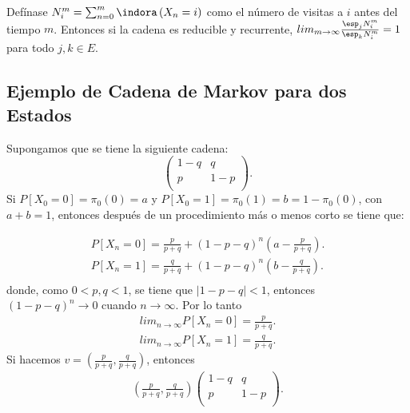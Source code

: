 \begin{Lema}
Def\'inase $N_{i}^{m}=\sum_{n=0}^{m}\indora\left(X_{n}=i\right)$ como el n\'umero de visitas a $i$ antes del tiempo $m$. Entonces si la cadena es reducible y recurrente, $lim_{m\rightarrow\infty}\frac{\esp_{j}N_{i}^{m}}{\esp_{k}N_{i}^{m}}=1$ para todo $j,k\in E$.
\end{Lema}


%
\subsection{Ejemplo de Cadena de Markov para dos Estados}
%

Supongamos que se tiene la siguiente cadena:
\begin{equation}
\left(\begin{array}{cc}
1-q & q\\
p & 1-p\\
\end{array}
\right).
\end{equation}
Si $P\left[X_{0}=0\right]=\pi_{0}(0)=a$ y $P\left[X_{0}=1\right]=\pi_{0}(1)=b=1-\pi_{0}(0)$, con $a+b=1$, entonces despu\'es de un procedimiento m\'as o menos corto se tiene que:

\begin{eqnarray*}
P\left[X_{n}=0\right]=\frac{p}{p+q}+\left(1-p-q\right)^{n}\left(a-\frac{p}{p+q}\right).\\
P\left[X_{n}=1\right]=\frac{q}{p+q}+\left(1-p-q\right)^{n}\left(b-\frac{q}{p+q}\right).\\
\end{eqnarray*}
donde, como $0<p,q<1$, se tiene que $|1-p-q|<1$, entonces $\left(1-p-q\right)^{n}\rightarrow 0$ cuando $n\rightarrow\infty$. Por lo tanto
\begin{eqnarray*}
lim_{n\rightarrow\infty}P\left[X_{n}=0\right]=\frac{p}{p+q}.\\
lim_{n\rightarrow\infty}P\left[X_{n}=1\right]=\frac{q}{p+q}.
\end{eqnarray*}
Si hacemos $v=\left(\frac{p}{p+q},\frac{q}{p+q}\right)$, entonces
\begin{eqnarray*}
\left(\frac{p}{p+q},\frac{q}{p+q}\right)\left(\begin{array}{cc}
1-q & q\\
p & 1-p\\
\end{array}\right).
\end{eqnarray*}


